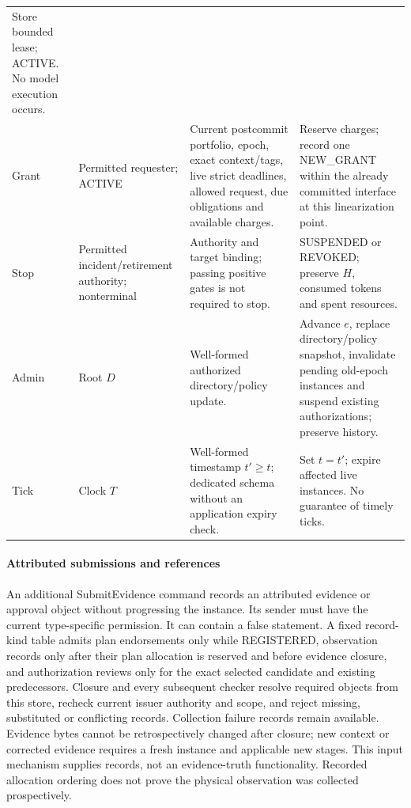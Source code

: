 \begin{table}[tp]
\begin{tabularx}{\textwidth}{@{}p{}p{}XX@{}}
Store bounded lease; ACTIVE. No model execution occurs. \\
Grant & Permitted requester; ACTIVE &
Current postcommit portfolio, epoch, exact context/tags, live strict deadlines, allowed request, due obligations and available charges. &
Reserve charges; record one NEW\_GRANT within the already committed interface at this linearization point. \\
Stop & Permitted incident/retirement authority; nonterminal &
Authority and target binding; passing positive gates is not required to stop. &
SUSPENDED or REVOKED; preserve $H$, consumed tokens and spent resources. \\
Admin & Root $D$ &
Well-formed authorized directory/policy update. &
Advance $e$, replace directory/policy snapshot, invalidate pending old-epoch instances and suspend existing authorizations; preserve history. \\
Tick & Clock $T$ &
Well-formed timestamp $t'\ge t$; dedicated schema without an application expiry check. &
Set $t=t'$; expire affected live instances. No guarantee of timely ticks. \\
\bottomrule
\end{tabularx}
\end{table}

\paragraph{Attributed submissions and references}
An additional SubmitEvidence command records an attributed evidence or
approval object without progressing the instance. Its sender must have
the current type-specific permission. It can contain a false statement.
A fixed record-kind table admits plan endorsements only while REGISTERED,
observation records only after their plan allocation is reserved and before
evidence closure, and authorization reviews only for the exact selected
candidate and existing predecessors. Closure and every subsequent checker
resolve required objects from this store, recheck current issuer authority
and scope, and reject missing, substituted or conflicting records.
Collection failure records remain available. Evidence bytes cannot be
retrospectively changed after closure; new context or corrected evidence
requires a fresh instance and applicable new stages. This input mechanism
supplies records, not an evidence-truth functionality. Recorded allocation
ordering does not prove the physical observation was collected prospectively.

